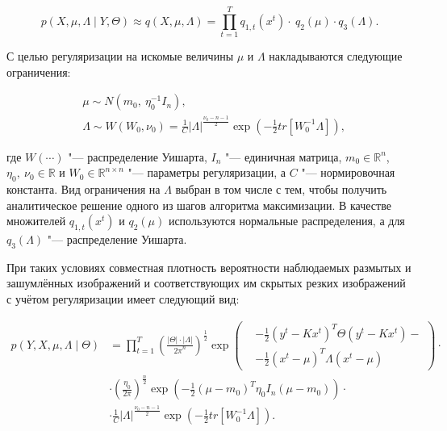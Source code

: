 \begin{equation*}
	p\left(X,\mu,\Lambda\middle|Y,\Theta\right)\approx q\left(X,\mu,\Lambda\right)=\prod_{t=1}^{T}{q_{1,t}\left(x^t\right)\cdot\ q_2\left(\mu\right)\cdot q_3\left(\Lambda\right)}.
\end{equation*}

С целью регуляризации на искомые величины $\mu$ и $\Lambda$ накладываются следующие ограничения:

\begin{align*}
	&\mu \sim N\left(m_0,\ \eta_0^{-1}I_n\right), \\
	&\Lambda \sim W\left(W_0,\nu_0\right)=\frac{1}{C}\left|\Lambda\right|^\frac{\nu_0-n-1}{2}\exp{\left(-\frac{1}{2}tr\left[W_0^{-1}\Lambda\right]\right)},
\end{align*}

\noindent где $W(\cdots)$ "--- распределение Уишарта, $I_n$ "--- единичная матрица, $m_0\in\mathbb{R}^n$, $\eta_0,\ \nu_0\in\mathbb{R}$ и $W_0\in\mathbb{R}^{n \times n}$ "--- параметры регуляризации, а $C$ "--- нормировочная константа. Вид ограничения на $\Lambda$ выбран в том числе с тем, чтобы получить аналитическое решение одного из шагов алгоритма максимизации. В качестве множителей $q_{1,t}\left(x^t\right)$ и $q_2\left(\mu\right)$ используются нормальные распределения, а для $q_3\left(\Lambda\right)$ "--- распределение Уишарта.

При таких условиях совместная плотность вероятности наблюдаемых размытых и зашумлённых изображений и соответствующих им скрытых резких изображений с учётом регуляризации имеет следующий вид:

\begin{align*}
	p\left(Y,X,\mu,\Lambda \middle| \Theta\right) &= \prod_{t=1}^{T} \left( \frac{\lvert\Theta\rvert \cdot \lvert\Lambda\rvert}{{2\pi}^{n}} \right)^\frac{1}{2} \exp\left(
	\begin{aligned}
		&-\frac{1}{2}\left(y^t-Kx^t\right)^T\Theta\left(y^t-Kx^t\right) - \\
		&-\frac{1}{2}\left(x^t-\mu\right)^T\Lambda\left(x^t-\mu\right)
	\end{aligned}
	\right) \cdot \\
	&\cdot \left(\frac{\eta_0}{2\pi}\right)^\frac{n}{2} \exp \left(-\frac{1}{2}\left(\mu-m_0\right)^T\eta_0I_n\left(\mu-m_0\right)\right) \cdot \\
	&\cdot \frac{1}{C}\lvert\Lambda\rvert^\frac{\nu_0-n-1}{2}\exp{\left(-\frac{1}{2}tr\left[W_0^{-1}\Lambda\right]\right)}.
\end{align*}

